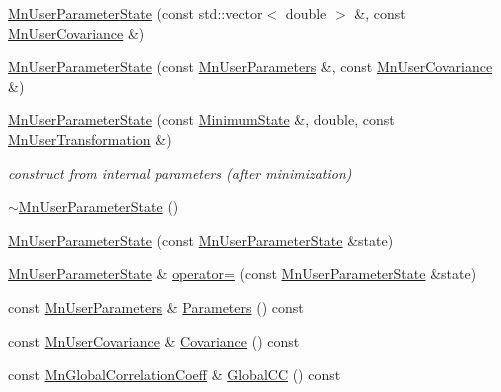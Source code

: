 \begin{DoxyCompactItemize}
\mbox{\hyperlink{classROOT_1_1Minuit2_1_1MnUserParameterState_adc49551ffd44db2eb6e2decfdafb2625}{Mn\+User\+Parameter\+State}} (const std\+::vector$<$ double $>$ \&, const \mbox{\hyperlink{classROOT_1_1Minuit2_1_1MnUserCovariance}{Mn\+User\+Covariance}} \&)
\item 
\mbox{\hyperlink{classROOT_1_1Minuit2_1_1MnUserParameterState_aafeef85943691c9736a58d6a7830259a}{Mn\+User\+Parameter\+State}} (const \mbox{\hyperlink{classROOT_1_1Minuit2_1_1MnUserParameters}{Mn\+User\+Parameters}} \&, const \mbox{\hyperlink{classROOT_1_1Minuit2_1_1MnUserCovariance}{Mn\+User\+Covariance}} \&)
\item 
\mbox{\hyperlink{classROOT_1_1Minuit2_1_1MnUserParameterState_a8214c3f41958849f1aaae4865bb5b129}{Mn\+User\+Parameter\+State}} (const \mbox{\hyperlink{classROOT_1_1Minuit2_1_1MinimumState}{Minimum\+State}} \&, double, const \mbox{\hyperlink{classROOT_1_1Minuit2_1_1MnUserTransformation}{Mn\+User\+Transformation}} \&)
\begin{DoxyCompactList}\small\item\em construct from internal parameters (after minimization) \end{DoxyCompactList}\item 
\mbox{\hyperlink{classROOT_1_1Minuit2_1_1MnUserParameterState_a3a5a64a086b883f61febd02676c0d151}{$\sim$\+Mn\+User\+Parameter\+State}} ()
\item 
\mbox{\hyperlink{classROOT_1_1Minuit2_1_1MnUserParameterState_aee3f88d39b420cc5451d862ac6b543fe}{Mn\+User\+Parameter\+State}} (const \mbox{\hyperlink{classROOT_1_1Minuit2_1_1MnUserParameterState}{Mn\+User\+Parameter\+State}} \&state)
\item 
\mbox{\hyperlink{classROOT_1_1Minuit2_1_1MnUserParameterState}{Mn\+User\+Parameter\+State}} \& \mbox{\hyperlink{classROOT_1_1Minuit2_1_1MnUserParameterState_af46ca603e05f41605057359254f02470}{operator=}} (const \mbox{\hyperlink{classROOT_1_1Minuit2_1_1MnUserParameterState}{Mn\+User\+Parameter\+State}} \&state)
\item 
const \mbox{\hyperlink{classROOT_1_1Minuit2_1_1MnUserParameters}{Mn\+User\+Parameters}} \& \mbox{\hyperlink{classROOT_1_1Minuit2_1_1MnUserParameterState_a486a8fc38e1581efd228ed43604e3fa7}{Parameters}} () const
\item 
const \mbox{\hyperlink{classROOT_1_1Minuit2_1_1MnUserCovariance}{Mn\+User\+Covariance}} \& \mbox{\hyperlink{classROOT_1_1Minuit2_1_1MnUserParameterState_a0e8ae6fe41fbc8eb1c218742ed080e0e}{Covariance}} () const
\item 
const \mbox{\hyperlink{classROOT_1_1Minuit2_1_1MnGlobalCorrelationCoeff}{Mn\+Global\+Correlation\+Coeff}} \& \mbox{\hyperlink{classROOT_1_1Minuit2_1_1MnUserParameterState_a92905c9d64bbd5367b339826ca358ee8}{Global\+CC}} () const

\end{DoxyCompactItemize}
